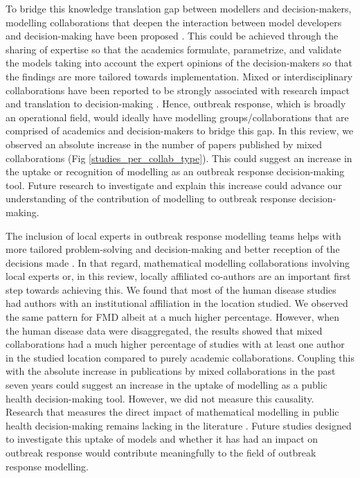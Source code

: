\documentclass[10pt,letterpaper]{article}
\begin{document}
To bridge this knowledge translation gap between modellers and decision-makers, modelling collaborations that deepen the interaction between model developers and decision-making have been proposed \cite{Choi2005,Rivers2019}. This could be achieved through the sharing of expertise so that the academics formulate, parametrize, and validate the models taking into account the expert opinions of the decision-makers so that the findings are more tailored towards implementation. Mixed or interdisciplinary collaborations have been reported to be strongly associated with research impact and translation to decision-making \cite{Deelstra2003}. Hence, outbreak response, which is broadly an operational field, would ideally have modelling groups/collaborations that are comprised of academics and decision-makers to bridge this gap. In this review, we observed an absolute increase in the number of papers published by mixed collaborations (Fig \ref{studies_per_collab_type}). This could suggest an increase in the uptake or recognition of modelling as an outbreak response decision-making tool. Future research to investigate and explain this increase could advance our understanding of the contribution of modelling to outbreak response decision-making.

The inclusion of local experts in outbreak response modelling teams helps with more tailored problem-solving and decision-making and better reception of the decisions made \cite{Abramowitz2015}. In that regard, mathematical modelling collaborations involving local experts or, in this review, locally affiliated co-authors are an important first step towards achieving this. We found that most of the human disease studies had authors with an institutional affiliation in the location studied. We observed the same pattern for FMD albeit at a much higher percentage. However, when the human disease data were disaggregated, the results showed that mixed collaborations had a much higher percentage of studies with at least one author in the studied location compared to purely academic collaborations. Coupling this with the absolute increase in publications by mixed collaborations in the past seven years could suggest an increase in the uptake of modelling as a public health decision-making tool. However, we did not measure this causality. Research that measures the direct impact of mathematical modelling in public health decision-making remains lacking in the literature \cite{Muscatello2017}. Future studies designed to investigate this uptake of models and whether it has had an impact on outbreak response would contribute meaningfully to the field of outbreak response modelling. 
\end{document}
